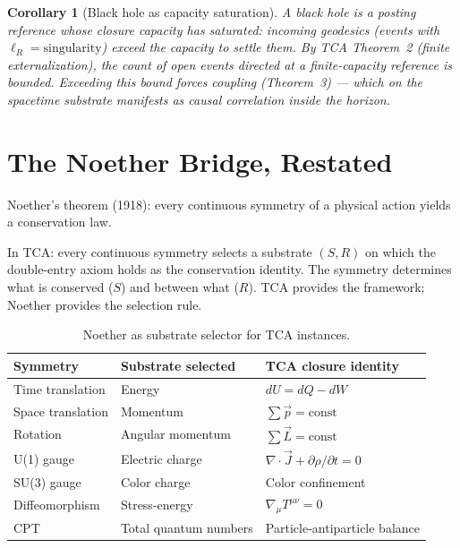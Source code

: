 \documentclass[11pt]{article}
\newtheorem{corollary}[theorem]{Corollary}
\theoremstyle{definition}
\theoremstyle{remark}
\begin{document}
\begin{corollary}[Black hole as capacity saturation]
A black hole is a posting reference whose closure capacity has
saturated: incoming geodesics (events with $\ell_R = \text{singularity}$)
exceed the capacity to settle them. By TCA Theorem~2 (finite
externalization), the count of open events directed at a
finite-capacity reference is bounded. Exceeding this bound forces
coupling (Theorem~3) --- which on the spacetime substrate manifests as
causal correlation inside the horizon.
\end{corollary}

\section{The Noether Bridge, Restated}

Noether's theorem (1918): every continuous symmetry of a physical
action yields a conservation law.

In TCA: every continuous symmetry selects a substrate $(S, R)$ on
which the double-entry axiom holds as the conservation identity.
The symmetry determines what is conserved ($S$) and between what
($R$). TCA provides the framework; Noether provides the selection
rule.

\begin{table}[h]
\centering
\begin{tabular}{@{}lll@{}}
\toprule
\textbf{Symmetry} & \textbf{Substrate selected} & \textbf{TCA closure identity} \\
\midrule
Time translation & Energy & $dU = dQ - dW$ \\
Space translation & Momentum & $\sum \vec{p} = \text{const}$ \\
Rotation & Angular momentum & $\sum \vec{L} = \text{const}$ \\
U(1) gauge & Electric charge & $\nabla \cdot \vec{J} + \partial\rho/\partial t = 0$ \\
SU(3) gauge & Color charge & Color confinement \\
Diffeomorphism & Stress-energy & $\nabla_\mu T^{\mu\nu} = 0$ \\
CPT & Total quantum numbers & Particle-antiparticle balance \\
\bottomrule
\end{tabular}
\caption{Noether as substrate selector for TCA instances.}
\end{table}

\end{document}

